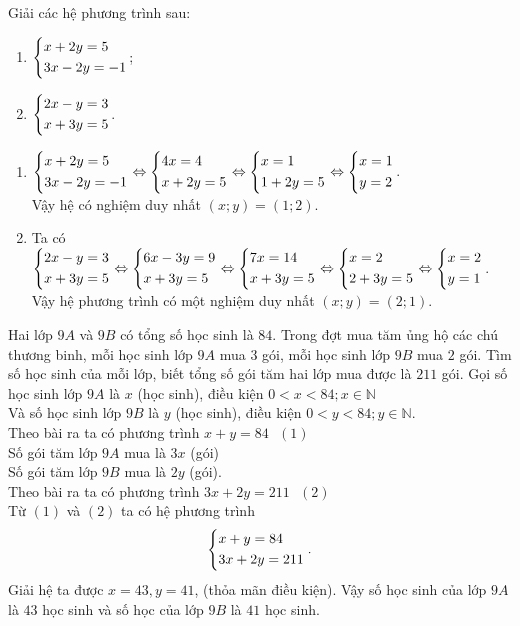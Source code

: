 \begin{ex}%
Giải các hệ phương trình sau:
\begin{multicols}{2}
    \begin{enumerate}    
        \item $\left\{\begin{aligned}&x+2y=5\\ &3x-2y=-1\end{aligned}\right.$;
        \item $\left\{\begin{aligned}&2x-y=3\\&x+3y=5\end{aligned}\right.$.
    \end{enumerate}
\end{multicols}
\loigiai
    {\begin{enumerate}    
        \item $\left\{\begin{aligned}&x+2y=5\\ &3x-2y=-1\end{aligned}\right. \Leftrightarrow \left\{\begin{aligned}&4x=4\\ &x+2y=5\end{aligned}\right. \Leftrightarrow \left\{\begin{aligned}&x=1\\ &1+2y=5\end{aligned}\right. \Leftrightarrow \left\{\begin{aligned}&x=1\\ &y=2\end{aligned}\right.$.\\
        Vậy hệ có nghiệm duy nhất $(x;y)=(1;2)$.
        \item Ta có $\left\{\begin{aligned}&2x-y=3\\&x+3y=5\end{aligned}\right. \Leftrightarrow \left\{\begin{aligned}&6x-3y=9\\&x+3y=5\end{aligned}\right. \Leftrightarrow \left\{\begin{aligned}&7x=14\\&x+3y=5\end{aligned}\right. \Leftrightarrow \left\{\begin{aligned}&x=2\\&2+3y=5\end{aligned}\right. \Leftrightarrow \left\{\begin{aligned}&x=2\\&y=1\end{aligned}\right.$.\\
        Vậy hệ phương trình có một nghiệm duy nhất $(x;y)=(2;1)$.
    \end{enumerate}
    
    }
\end{ex}

\begin{ex}%
    Hai lớp $9A$ và $9B$ có tổng số học sinh là $84$. Trong đợt mua tăm ủng hộ các chú thương binh, mỗi học sinh lớp $9A$ mua $3$ gói, mỗi học sinh lớp $9B$ mua $2$ gói. Tìm số học sinh của mỗi lớp, biết tổng số gói tăm hai lớp mua được là $211$ gói.
\loigiai
    {Gọi số học sinh lớp $9A$ là $x$ (học sinh), điều kiện $0<x<84; x\in \mathbb{N}$\\
    Và số học sinh lớp $9B$ là $y$ (học sinh), điều kiện $0<y<84; y\in \mathbb{N}$.\\
    Theo bài ra ta có phương trình $x+y=84\,\,\,\,(1)$\\
    Số gói tăm lớp $9A$ mua là $3x$ (gói)\\
    Số gói tăm lớp $9B$ mua là $2y$ (gói).\\
    Theo bài ra ta có phương trình $3x+2y=211\,\,\,\,(2)$\\
    Từ $(1)$ và $(2)$ ta có hệ phương trình
    $$\left\{\begin{aligned}&x+y=84\\&3x+2y=211\end{aligned}\right..$$
    Giải hệ ta được $x=43, y=41$, (thỏa mãn điều kiện).
    Vậy số học sinh của lớp $9A$ là $43$ học sinh và số học của lớp $9B$ là $41$ học sinh.
    }
\end{ex}

